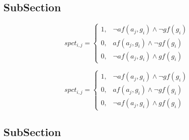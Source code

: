 \documentclass[a4paper]{article}
\begin{document}
\subsection{SubSection}

\begin{equation}
spct_{i,j} =
\begin{cases}
1, & \text{$\neg af(a_j,g_i) \wedge \neg gf(g_i)$}\\
0, & \text{$af(a_j,g_i) \wedge \neg gf(g_i)$}\\
0, & \text{$\neg af(a_j,g_i) \wedge gf(g_i)$}
\end{cases}
\end{equation}

\begin{equation}
spct_{i,j} =
\begin{cases}
1, & \text{$\neg af(a_j,g_i) \wedge \neg gf(g_i)$}\\
0, & \text{$af(a_j,g_i) \wedge \neg gf(g_i)$}\\
0, & \text{$\neg af(a_j,g_i) \wedge gf(g_i)$}
\end{cases}
\end{equation}

\subsection{SubSection}
\end{document}
